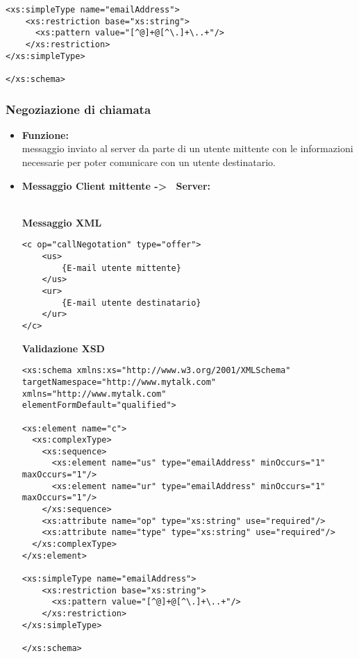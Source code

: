 {{\begin{itemize}
{\begin{lstlisting}
<xs:simpleType name="emailAddress"> 
    <xs:restriction base="xs:string"> 
      <xs:pattern value="[^@]+@[^\.]+\..+"/> 
    </xs:restriction> 
</xs:simpleType> 

</xs:schema>
				\end{lstlisting}
				}
		\end{itemize}
	}%
	
	\subsubsection{Negoziazione di chiamata}{
	\label{opCNeg}
		\begin{itemize}
			\item[] \textbf{Funzione:}{\\
				messaggio inviato al server da parte di un utente mittente con le informazioni necessarie per poter comunicare con un utente destinatario.
				}
			
			\item[] \textbf{Messaggio Client mittente -\textgreater~ Server:}{\\
			\textbf{Messaggio XML}\\
				\begin{lstlisting}
<c op="callNegotation" type="offer">
	<us>
		{E-mail utente mittente}
	</us>
	<ur>
		{E-mail utente destinatario}
	</ur>
</c>
				\end{lstlisting}
				\textbf{Validazione XSD}\\
				\begin{lstlisting}
<xs:schema xmlns:xs="http://www.w3.org/2001/XMLSchema"
targetNamespace="http://www.mytalk.com"
xmlns="http://www.mytalk.com"
elementFormDefault="qualified">

<xs:element name="c">
  <xs:complexType>
    <xs:sequence>
      <xs:element name="us" type="emailAddress" minOccurs="1" maxOccurs="1"/>
      <xs:element name="ur" type="emailAddress" minOccurs="1" maxOccurs="1"/>
    </xs:sequence>
    <xs:attribute name="op" type="xs:string" use="required"/>
    <xs:attribute name="type" type="xs:string" use="required"/>
  </xs:complexType>
</xs:element>

<xs:simpleType name="emailAddress"> 
    <xs:restriction base="xs:string"> 
      <xs:pattern value="[^@]+@[^\.]+\..+"/> 
    </xs:restriction> 
</xs:simpleType> 

</xs:schema>
				\end{lstlisting}
				}
				

\end{itemize}}}
